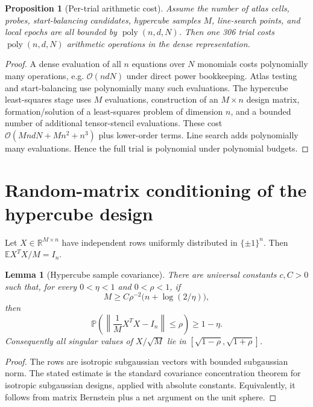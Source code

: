 \documentclass[11pt]{article}
\newtheorem{proposition}[definition]{Proposition}
\newtheorem{lemma}[definition]{Lemma}
\newcommand{\R}{\mathbb R}
\newcommand{\E}{\mathbb E}
\newcommand{\Prob}{\mathbb P}
\newcommand{\OO}{\mathcal O}
\newcommand{\poly}{\operatorname{poly}}
\begin{document}
\begin{proposition}[Per-trial arithmetic cost]\label{prop:cost}
Assume the number of atlas cells, probes, start-balancing candidates, hypercube samples $M$, line-search points, and local epochs are all bounded by $\poly(n,d,N)$.  Then one 306 trial costs $\poly(n,d,N)$ arithmetic operations in the dense representation.
\end{proposition}

\begin{proof}
A dense evaluation of all $n$ equations over $N$ monomials costs polynomially many operations, e.g. $\OO(ndN)$ under direct power bookkeeping.  Atlas testing and start-balancing use polynomially many such evaluations.  The hypercube least-squares stage uses $M$ evaluations, construction of an $M\times n$ design matrix, formation/solution of a least-squares problem of dimension $n$, and a bounded number of additional tensor-stencil evaluations.  These cost $\OO(MndN+Mn^2+n^3)$ plus lower-order terms.  Line search adds polynomially many evaluations.  Hence the full trial is polynomial under polynomial budgets.
\end{proof}

\section{Random-matrix conditioning of the hypercube design}\label{sec:rm}

Let $X\in\R^{M\times n}$ have independent rows uniformly distributed in $\{\pm1\}^n$.  Then $\E X^TX/M=I_n$.

\begin{lemma}[Hypercube sample covariance]\label{lem:cov}
There are universal constants $c,C>0$ such that, for every $0<\eta<1$ and $0<\rho<1$, if
\[
        M\ge C\rho^{-2}\bigl(n+\log(2/\eta)\bigr),
\]
then
\[
        \Prob\left(\left\|\frac1M X^TX-I_n\right\|\le\rho\right)\ge1-\eta.
\]
Consequently all singular values of $X/\sqrt M$ lie in $[\sqrt{1-\rho},\sqrt{1+\rho}]$.
\end{lemma}

\begin{proof}
The rows are isotropic subgaussian vectors with bounded subgaussian norm.  The stated estimate is the standard covariance concentration theorem for isotropic subgaussian designs, applied with absolute constants.  Equivalently, it follows from matrix Bernstein plus a net argument on the unit sphere.
\end{proof}
\end{document}
